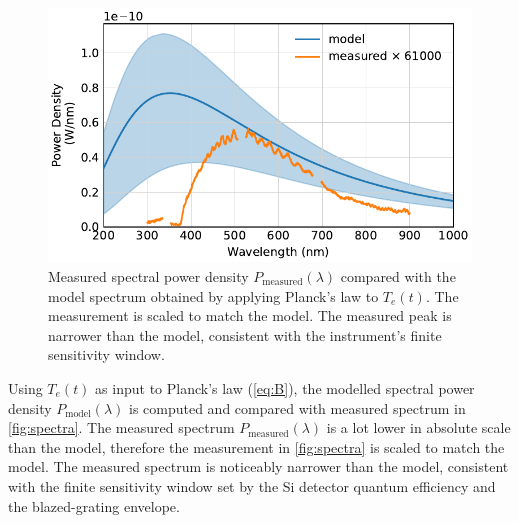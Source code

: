 \documentclass[
	parskip=half,
	a4paper,
]{scrarticle}
\begin{document}
\begin{figure}
    \centering
    \includegraphics{../analysis/figures/spectrum de.pdf}
    \caption{Measured spectral power density \(P_\text{measured}(\lambda)\) compared with the model spectrum obtained by applying Planck’s law to \(T_e(t)\). The measurement is scaled to match the model. The measured peak is narrower than the model, consistent with the instrument’s finite sensitivity window.}
    \label{fig:spectra}
\end{figure}
Using \(T_e(t)\) as input to Planck’s law (\autoref{eq:B}), the modelled spectral power density \(P_\text{model}(\lambda)\) is computed and compared with measured spectrum in \autoref{fig:spectra}. 
The measured spectrum \(P_\text{measured}(\lambda)\) is a lot lower in absolute scale than the model, therefore the measurement in \autoref{fig:spectra} is scaled to match the model. The measured spectrum is noticeably narrower than the model, consistent with the finite sensitivity window set by the Si detector quantum efficiency and the blazed-grating envelope.
\end{document}
